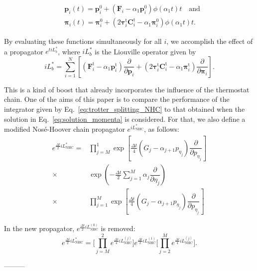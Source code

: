 \documentclass[aip,jcp,reprint,amsmath,amssymb]{revtex4-1}
\newcommand{\mt}[1]{\boldsymbol{\mathbf{#1}}}           %
\newcommand{\vt}[1]{\boldsymbol{\mathbf{#1}}}           %
\newcommand{\tr}[1]{#1^\text{t}}                        %
\newcommand{\diff}[2]{\dfrac{\partial #1}{\partial #2}} %
\begin{document}
\begin{subequations}
\label{eq:solution_momenta}
\begin{align}
&{\vt p}_i(t) = {\vt p}_i^0 + \left({\vt F}_i - \alpha_1 {\vt p}_i^0 \right) \phi\left(\alpha_1 t \right) t \quad \text{and} \label{eq:solution_p} \\
&{\vt \pi}_i(t) = {\vt \pi}_i^0 + \left(2 \tr{\vt \tau}_i \tr{\mt C}_i - \alpha_1 {\vt \pi}_i^0 \right) \phi\left(\alpha_1 t \right) t. \label{eq:solution_pi}
\end{align}
\end{subequations}

By evaluating these functions simultaneously for all $i$, we accomplish the effect of a propagator $e^{t i\!L_b^\ast}$, where $i\!L_b^\ast$ is the Liouville operator given by
\[
i\!L_b^\ast = \sum_{i=1}^N \left[ \left( \tr{\vt F}_i - \alpha_1 \tr{\vt p}_i \right) \diff{}{\vt p_i} + \left(2 \tr{\vt \tau}_i \tr{\mt C}_i - \alpha_1 \tr{\vt \pi}_i \right) \diff{}{\vt \pi_i} \right].
\]

This is a kind of boost that already incorporates the influence of the thermostat chain. One of the aims of this paper is to compare the performance of the integrator given by Eq.~\ref{eq:trotter_splitting_NHC} to that obtained when the solution in Eq.~\ref{eq:solution_momenta} is considered. For that, we also define a modified Nos\'e-Hoover chain propagator $e^{i\!L^\ast_\text{NHC}}$, as follows:
\begin{equation}
\begin{split}
e^{\frac{\Delta t}{2} i\!L_\text{NHC}^\ast } = &\prod_{j=M}^1 \exp\left[\frac{\Delta t}{4} \left( G_j - \alpha_{j+1} p_{\eta_j} \right) \diff{}{p_{\eta_j}}\right] \\
\times &\exp\left(-\frac{\Delta t}{2} \sum_{j=1}^M \alpha_j \diff{}{\eta_j}\right) \\
\times &\prod_{j=1}^M \exp\left[\frac{\Delta t}{4} \left( G_j - \alpha_{j+1} p_{\eta_j} \right) \diff{}{p_{\eta_j}}\right]
\end{split}
\end{equation}

In the new propagator, $e^{\frac{\Delta t}{2} i\!L_\text{NHC}^{(0)} }$ is removed:
\[
e^{\frac{\Delta t}{2} i\!L_\text{NHC}^\ast} = \Bigg[ \prod_{j=M}^2 e^{\frac{\Delta t}{4} i\!L_\text{NHC}^{(j)} } \Bigg] e^{\frac{\Delta t}{2} i\!L_\text{NHC}^{(1)} } \Bigg[ \prod_{j=2}^M e^{\frac{\Delta t}{4} i\!L_\text{NHC}^{(j)} } \Bigg].
\]

---------
\end{document}
